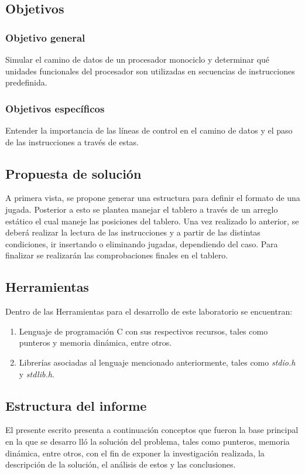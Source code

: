 \subsection{Objetivos}
\subsubsection{Objetivo general}
\noindent Simular el camino de datos de un procesador monociclo y determinar qué unidades funcionales del procesador son utilizadas en secuencias de instrucciones predefinida.
\subsubsection{Objetivos específicos}
\noindent Entender la importancia de las líneas de control en el camino de datos y el paso de las instrucciones a través de estas.

\subsection{Propuesta de solución}

\noindent A primera vista, se propone generar una estructura para definir el formato de una jugada. Posterior a esto se plantea manejar el tablero a través de un arreglo estático el cual maneje las posiciones del tablero. Una vez realizado lo anterior, se deberá realizar la lectura de las instrucciones y a partir de las distintas condiciones, ir insertando o eliminando jugadas, dependiendo del caso. Para finalizar se realizarán las comprobaciones finales en el tablero.

\subsection{Herramientas}
\noindent Dentro de las Herramientas para el desarrollo de este laboratorio se encuentran:

\begin{enumerate}
    \item Lenguaje de programación C con sus respectivos recursos, tales como punteros y memoria dinámica, entre otros.
    \item Librerías asociadas al lenguaje mencionado anteriormente, tales como \textit{stdio.h} y \textit{stdlib.h}.
\end{enumerate}

\subsection{Estructura del informe}
\noindent El presente escrito presenta a continuación conceptos que fueron la base principal en la que se desarro   lló la solución del problema, tales como punteros, memoria dinámica, entre otros, con el fin de exponer la investigación realizada, la descripción de la solución, el análisis de estos y las conclusiones.
